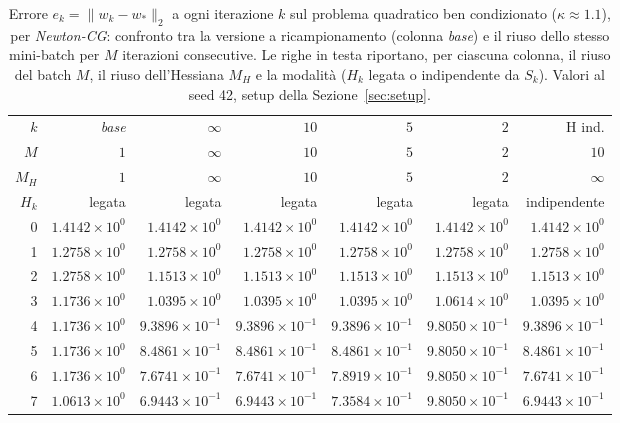 \begin{table}[H]
\centering
\footnotesize
\renewcommand{\arraystretch}{0.85}
\setlength{\tabcolsep}{2pt}
\caption{Errore $e_k=\|w_k-w_*\|_2$ a ogni iterazione $k$ sul problema quadratico ben condizionato ($\kappa\approx 1.1$), per \emph{Newton-CG}: confronto tra la versione a ricampionamento (colonna \emph{base}) e il riuso dello stesso mini-batch per $M$ iterazioni consecutive. Le righe in testa riportano, per ciascuna colonna, il riuso del batch $M$, il riuso dell'Hessiana $M_H$ e la modalità ($H_k$ legata o indipendente da $S_k$). Valori al seed 42, setup della Sezione~\ref{sec:setup}.}
\label{tab:riuso_bencond_ncg}
\begin{tabular}{@{}rrrrrrr@{}}
\toprule
$k$ & \emph{base} & $\infty$ & $10$ & $5$ & $2$ & H ind.\\
$M$ & $1$ & $\infty$ & $10$ & $5$ & $2$ & $10$\\
$M_H$ & $1$ & $\infty$ & $10$ & $5$ & $2$ & $\infty$\\
$H_k$ & legata & legata & legata & legata & legata & indipendente\\
\midrule
0 & $1.4142\times10^{0}$ & $1.4142\times10^{0}$ & $1.4142\times10^{0}$ & $1.4142\times10^{0}$ & $1.4142\times10^{0}$ & $1.4142\times10^{0}$\\
1 & $1.2758\times10^{0}$ & $1.2758\times10^{0}$ & $1.2758\times10^{0}$ & $1.2758\times10^{0}$ & $1.2758\times10^{0}$ & $1.2758\times10^{0}$\\
2 & $1.2758\times10^{0}$ & $1.1513\times10^{0}$ & $1.1513\times10^{0}$ & $1.1513\times10^{0}$ & $1.1513\times10^{0}$ & $1.1513\times10^{0}$\\
3 & $1.1736\times10^{0}$ & $1.0395\times10^{0}$ & $1.0395\times10^{0}$ & $1.0395\times10^{0}$ & $1.0614\times10^{0}$ & $1.0395\times10^{0}$\\
4 & $1.1736\times10^{0}$ & $9.3896\times10^{-1}$ & $9.3896\times10^{-1}$ & $9.3896\times10^{-1}$ & $9.8050\times10^{-1}$ & $9.3896\times10^{-1}$\\
5 & $1.1736\times10^{0}$ & $8.4861\times10^{-1}$ & $8.4861\times10^{-1}$ & $8.4861\times10^{-1}$ & $9.8050\times10^{-1}$ & $8.4861\times10^{-1}$\\
6 & $1.1736\times10^{0}$ & $7.6741\times10^{-1}$ & $7.6741\times10^{-1}$ & $7.8919\times10^{-1}$ & $9.8050\times10^{-1}$ & $7.6741\times10^{-1}$\\
7 & $1.0613\times10^{0}$ & $6.9443\times10^{-1}$ & $6.9443\times10^{-1}$ & $7.3584\times10^{-1}$ & $9.8050\times10^{-1}$ & $6.9443\times10^{-1}$\\

\end{tabular}
\end{table}
